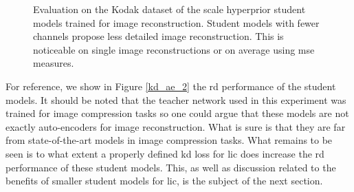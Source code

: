 \begin{figure}[H]
    \centering
    \qquad
    \caption[Evaluation on the Kodak dataset of the scale hyperprior student models trained for image reconstruction.]{Evaluation on the Kodak dataset of the scale hyperprior student models trained for image reconstruction. Student models with fewer channels propose less detailed image reconstruction. This is noticeable on single image reconstructions or on average using \acrshort{mse} measures.}
    \label{kd_ae_1}
\end{figure}

For reference, we show in Figure \ref{kd_ae_2} the \acrshort{rd} performance of the student models. It should be noted that the teacher network used in this experiment was trained for image compression tasks so one could argue that these models are not exactly auto-encoders for image reconstruction. What is sure is that they are far from state-of-the-art models in image compression tasks. What remains to be seen is to what extent a properly defined \acrshort{kd} loss for \acrshort{lic} does increase the \acrshort{rd} performance of these student models. This, as well as discussion related to the benefits of smaller student models for \acrshort{lic}, is the subject of the next section.


